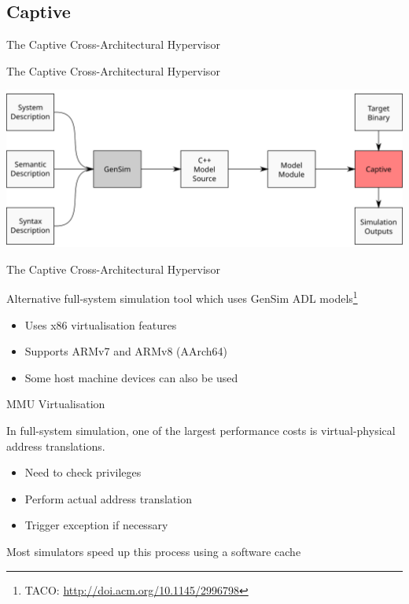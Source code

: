 \subsection{Captive}

\begin{frame}{The Captive Cross-Architectural Hypervisor}

\end{frame}

\begin{frame}{The Captive Cross-Architectural Hypervisor}

\centering
\includegraphics[width=\textwidth]{figures/gensim-toolflow-captive}

\end{frame}

\begin{frame}{The Captive Cross-Architectural Hypervisor}

Alternative full-system simulation tool which uses GenSim ADL models\footnote{TACO: \url{http://doi.acm.org/10.1145/2996798}}

\begin{itemize}
	\item Uses x86 virtualisation features
	\item Supports ARMv7 and ARMv8 (AArch64)
	\item Some host machine devices can also be used
\end{itemize}

\end{frame}

\begin{frame}{MMU Virtualisation}

In full-system simulation, one of the largest performance costs is virtual-physical address translations.

\begin{itemize}
	\item Need to check privileges
	\item Perform actual address translation
	\item Trigger exception if necessary
\end{itemize}

Most simulators speed up this process using a software cache

\end{frame}

